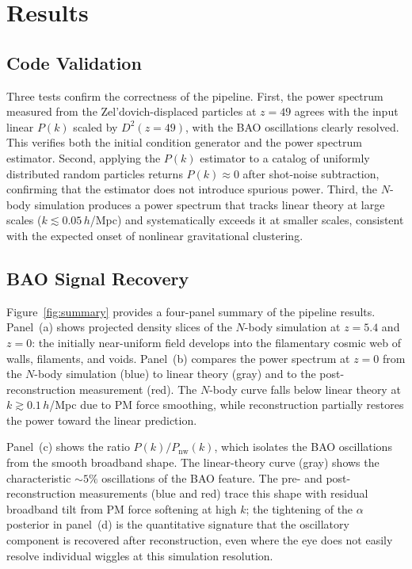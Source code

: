 \documentclass[10pt]{article}
\begin{document}
\section{Results}

\subsection{Code Validation}

Three tests confirm the correctness of the pipeline.  First, the power spectrum measured from the Zel'dovich-displaced particles at $z = 49$ agrees with the input linear $P(k)$ scaled by $D^2(z = 49)$, with the BAO oscillations clearly resolved.  This verifies both the initial condition generator and the power spectrum estimator.  Second, applying the $P(k)$ estimator to a catalog of uniformly distributed random particles returns $P(k) \approx 0$ after shot-noise subtraction, confirming that the estimator does not introduce spurious power.  Third, the $N$-body simulation produces a power spectrum that tracks linear theory at large scales ($k \lesssim 0.05$\,$h$/Mpc) and systematically exceeds it at smaller scales, consistent with the expected onset of nonlinear gravitational clustering.

\subsection{BAO Signal Recovery}

Figure~\ref{fig:summary} provides a four-panel summary of the pipeline results.  Panel~(a) shows projected density slices of the $N$-body simulation at $z = 5.4$ and $z = 0$: the initially near-uniform field develops into the filamentary cosmic web of walls, filaments, and voids.  Panel~(b) compares the power spectrum at $z = 0$ from the $N$-body simulation (blue) to linear theory (gray) and to the post-reconstruction measurement (red).  The $N$-body curve falls below linear theory at $k \gtrsim 0.1$\,$h$/Mpc due to PM force smoothing, while reconstruction partially restores the power toward the linear prediction.

Panel~(c) shows the ratio $P(k)/P_{\mathrm{nw}}(k)$, which isolates the BAO oscillations from the smooth broadband shape.  The linear-theory curve (gray) shows the characteristic $\sim\!5\%$ oscillations of the BAO feature.  The pre- and post-reconstruction measurements (blue and red) trace this shape with residual broadband tilt from PM force softening at high $k$; the tightening of the $\alpha$ posterior in panel~(d) is the quantitative signature that the oscillatory component is recovered after reconstruction, even where the eye does not easily resolve individual wiggles at this simulation resolution.
\end{document}
